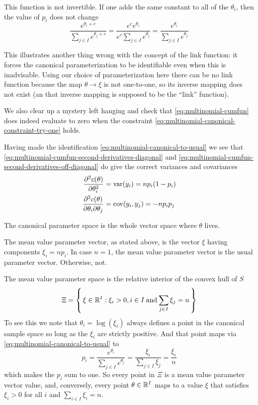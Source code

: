 This function is not invertible.  If one adds the same constant
to all of the $\theta_i$, then the value of $p_i$ does not change
$$
   \frac{e^{\theta_i + c}}{\sum_{j \in I} e^{\theta_j + c}}
   =
   \frac{e^c e^{\theta_i}}{e^c \sum_{j \in I} e^{\theta_j}}
   =
   \frac{e^{\theta_i}}{\sum_{j \in I} e^{\theta_j}}
$$

This illustrates another thing wrong with the concept of the link function:
it forces the canonical parameterization to be identifiable even when this
is inadvisable.  Using our choice of parameterization here there can be
no link function because the map $\theta \to \xi$ is not one-to-one, so
its inverse mapping does not exist (an that inverse mapping is supposed to
be the ``link'' function).

We also clear up a mystery left hanging and check
that \eqref{eq:multinomial-cumfun} does indeed evaluate to zero when the
constraint \eqref{eq:multinomial-canonical-constraint-try-one} holds.

Having made the identification \eqref{eq:multinomial-canonical-to-usual}
we see that \eqref{eq:multinomial-cumfun-second-derivatives-diagonal}
and \eqref{eq:multinomial-cumfun-second-derivatives-off-diagonal}
do give the correct variances and covariances
\begin{align*}
   \frac{\partial^2 c(\theta)}{\partial \theta_i^2}
   & =
   \operatorname{var}(y_i) = n p_i (1 - p_i)
   \\
   \frac{\partial^2 c(\theta)}{\partial \theta_i \partial \theta_j}
   & =
   \operatorname{cov}(y_i, y_j) = - n p_i p_j
\end{align*}

The canonical parameter space is the whole vector space where $\theta$ lives.

The mean value parameter vector, as stated above, is the vector $\xi$ having
components $\xi_i = n p_i$.  In case $n = 1$, the mean value parameter vector
is the usual parameter vector.  Otherwise, not.

The mean value parameter space is the relative interior of the
convex hull of $S$
\begin{equation} \label{eq:multinomial-mean-value-parameter-space}
   \Xi
   =
   \left\{\,  \xi \in \mathbb{R}^I : \xi_i > 0, i \in I \mathbin{\rm and}
   \sum_{j \in I} \xi_j = n  \,\right\}
\end{equation}
To see this we note that $\theta_i = \log(\xi_i)$ always defines a point
in the canonical sample space so long as the $\xi_i$ are strictly positive.
And that point maps via \eqref{eq:multinomial-canonical-to-usual} to
$$
   p_i = \frac{e^{\theta_i}}{\sum_{j \in I} e^{\theta_j}}
   =
   \frac{\xi_i}{\sum_{j \in I} \xi_j} = \frac{\xi_i}{n}
$$
which makes the $p_i$ sum to one.
So every point in $\Xi$ is a mean value parameter vector value,
and, conversely, every point $\theta \in \mathbb{R}^I$ maps to a value $\xi$
that satisfies $\xi_i > 0$ for all $i$ and $\sum_{i \in I} \xi_i = n$.

